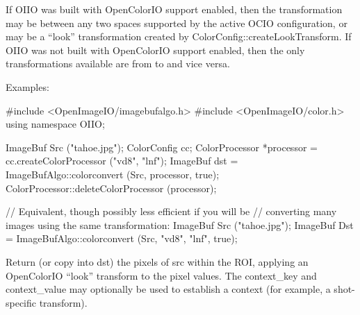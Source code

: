 If OIIO was built with OpenColorIO support enabled, then the transformation
may be between any two spaces supported by the active OCIO configuration, or
may be a ``look'' transformation created by {\cf
ColorConfig::createLookTransform}.  If OIIO was not built with OpenColorIO
support enabled, then the only transformations available are from 
to  and vice versa.

\smallskip
\noindent Examples:
\begin{code}
    #include <OpenImageIO/imagebufalgo.h>
    #include <OpenImageIO/color.h>
    using namespace OIIO;

    ImageBuf Src ("tahoe.jpg");
    ColorConfig cc;
    ColorProcessor *processor = cc.createColorProcessor ("vd8", "lnf");
    ImageBuf dst = ImageBufAlgo::colorconvert (Src, processor, true);
    ColorProcessor::deleteColorProcessor (processor);

    // Equivalent, though possibly less efficient if you will be
    // converting many images using the same transformation:
    ImageBuf Src ("tahoe.jpg");
    ImageBuf Dst = ImageBufAlgo::colorconvert (Src, "vd8", "lnf", true);
\end{code}
\apiend

 
Return (or copy into {\cf dst}) the pixels of {\cf src} within the ROI,
applying an OpenColorIO ``look'' transform to the pixel values.
The {\cf context_key} and {\cf context_value} may optionally be used
to establish a context (for example, a shot-specific transform).

